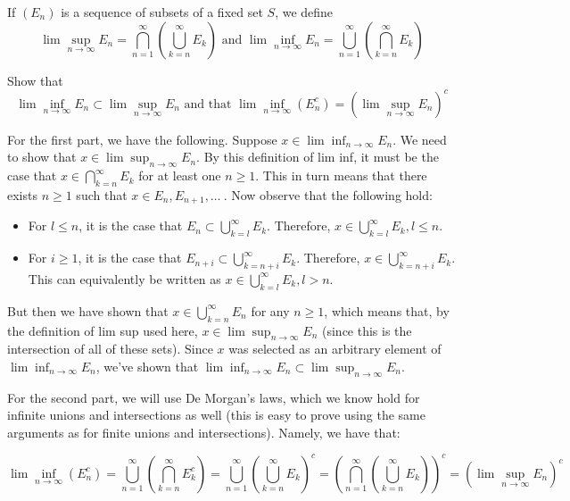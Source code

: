 \begin{exercise}{37}
    If $(E_n)$ is a sequence of subsets of a fixed set $S$, we define
    $$\lim \sup_{n \rightarrow \infty} E_n = \bigcap_{n=1}^{\infty}(\bigcup_{k=n}^{\infty} E_k) \text{ and } \lim \inf_{n \rightarrow \infty} E_n = \bigcup_{n=1}^{\infty}(\bigcap_{k=n}^{\infty} E_k)$$

    Show that
    $$\lim \inf_{n \rightarrow \infty} E_n \subset \lim \sup_{n \rightarrow \infty} E_n \text{ and that } \lim \inf_{n \rightarrow \infty} (E_n^{c}) = (\lim \sup_{n \rightarrow \infty} E_n)^c$$
    
\end{exercise}

\begin{solution}

    For the first part, we have the following. Suppose $x \in \lim \inf_{n \rightarrow \infty} E_n$. We need to show that $x \in \lim \sup_{n \rightarrow \infty} E_n$. By this definition of lim inf, it must be the case that $x \in \bigcap_{k=n}^{\infty} E_k$ for at least one $n \geq 1$. This in turn means that there exists $n \geq 1$ such that $x \in E_n, E_{n+1}, \ldots\ $. Now observe that the following hold:
    \begin{itemize}
        \item For $l \leq n$, it is the case that $E_n \subset \bigcup_{k=l}^{\infty} E_k$. Therefore, $x \in \bigcup_{k=l}^{\infty} E_k, l \leq n$.
        \item For $i \geq 1$, it is the case that $E_{n+i} \subset \bigcup_{k=n+i}^{\infty} E_k$. Therefore, $x \in \bigcup_{k=n+i}^{\infty} E_k$. This can equivalently be written as $x \in \bigcup_{k=l}^{\infty} E_k, l > n$.
    \end{itemize}
    But then we have shown that $x \in \bigcup_{k=n}^{\infty} E_n$ for any $n \geq 1$, which means that, by the definition of lim sup used here, $x \in \lim \sup_{n \rightarrow \infty} E_n$ (since this is the intersection of all of these sets). Since $x$ was selected as an arbitrary element of $\lim \inf_{n \rightarrow \infty} E_n$, we've shown that $\lim \inf_{n \rightarrow \infty} E_n \subset \lim \sup_{n \rightarrow \infty} E_n$.

    For the second part, we will use De Morgan's laws, which we know hold for infinite unions and intersections as well (this is easy to prove using the same arguments as for finite unions and intersections). Namely, we have that:

    $$\lim \inf_{n \rightarrow \infty} (E_n^{c}) = \bigcup_{n=1}^{\infty}( \bigcap_{k=n}^{\infty} E_k^c) =\bigcup_{n=1}^{\infty} ( \bigcup_{k=n}^{\infty} E_k)^c = (\bigcap_{n=1}^{\infty} (\bigcup_{k=n}^{\infty} E_k))^c = (\lim \sup_{n \rightarrow \infty} E_n)^c$$
\end{solution}

